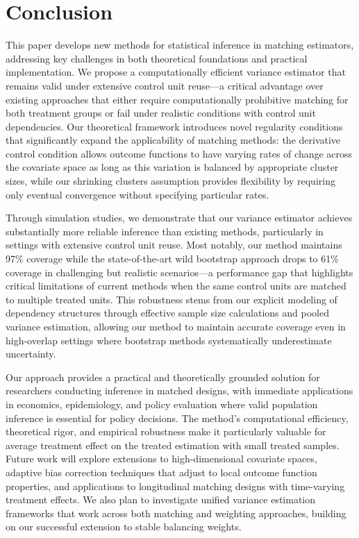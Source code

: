 \documentclass{mytemplate}
\begin{document}
\section{Conclusion}
This paper develops new methods for statistical inference in matching estimators, addressing key challenges in both theoretical foundations and practical implementation. We propose a computationally efficient variance estimator that remains valid under extensive control unit reuse—a critical advantage over existing approaches that either require computationally prohibitive matching for both treatment groups or fail under realistic conditions with control unit dependencies. Our theoretical framework introduces novel regularity conditions that significantly expand the applicability of matching methods: the derivative control condition allows outcome functions to have varying rates of change across the covariate space as long as this variation is balanced by appropriate cluster sizes, while our shrinking clusters assumption provides flexibility by requiring only eventual convergence without specifying particular rates.

Through simulation studies, we demonstrate that our variance estimator achieves substantially more reliable inference than existing methods, particularly in settings with extensive control unit reuse. Most notably, our method maintains 97\% coverage while the state-of-the-art wild bootstrap approach drops to 61\% coverage in challenging but realistic scenarios—a performance gap that highlights critical limitations of current methods when the same control units are matched to multiple treated units. This robustness stems from our explicit modeling of dependency structures through effective sample size calculations and pooled variance estimation, allowing our method to maintain accurate coverage even in high-overlap settings where bootstrap methods systematically underestimate uncertainty.

Our approach provides a practical and theoretically grounded solution for researchers conducting inference in matched designs, with immediate applications in economics, epidemiology, and policy evaluation where valid population inference is essential for policy decisions. The method's computational efficiency, theoretical rigor, and empirical robustness make it particularly valuable for average treatment effect on the treated estimation with small treated samples. Future work will explore extensions to high-dimensional covariate spaces, adaptive bias correction techniques that adjust to local outcome function properties, and applications to longitudinal matching designs with time-varying treatment effects. We also plan to investigate unified variance estimation frameworks that work across both matching and weighting approaches, building on our successful extension to stable balancing weights.
\end{document}

